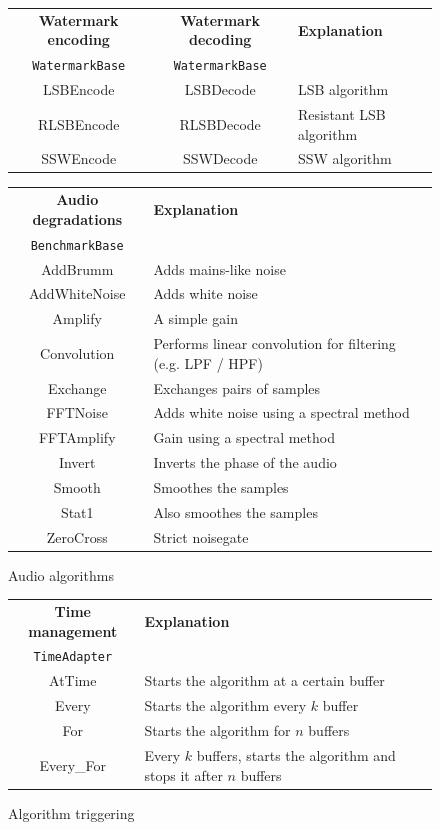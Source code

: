 \begin{figure}[h!]
\centering
\begin{tabular}{|c|c|l|}
\hline
\textbf{Watermark encoding} & \textbf{Watermark decoding} & \textbf{Explanation} \\
\texttt{WatermarkBase} & \texttt{WatermarkBase} & \\
\hline
LSBEncode & LSBDecode & \ac{LSB} algorithm \\
RLSBEncode & RLSBDecode & Resistant \ac{LSB} algorithm \\
SSWEncode & SSWDecode & \ac{SSW} algorithm \\
\hline
\end{tabular}

\vspace{1em}

\begin{tabular}{|c|l|}
\hline
\textbf{Audio degradations} & \textbf{Explanation} \\
\texttt{BenchmarkBase} & \\
\hline
AddBrumm & Adds mains-like noise \\
AddWhiteNoise & Adds white noise \\
Amplify & A simple gain \\
Convolution & Performs linear convolution for filtering (e.g. LPF / HPF)\cite{convolution}\\
Exchange & Exchanges pairs of samples \\
FFTNoise & Adds white noise using a spectral method \\
FFTAmplify & Gain using a spectral method \\
Invert & Inverts the phase of the audio \\
Smooth & Smoothes the samples \\ 
Stat1 & Also smoothes the samples \\
ZeroCross & Strict noisegate\\
\hline
\end{tabular} 
\caption{Audio algorithms}
\label{frameworkclass2}
\end{figure}

\begin{figure}[h!]
\centering
\begin{tabular}{|c|l|}
\hline
\textbf{Time management} & \textbf{Explanation} \\
\texttt{TimeAdapter} & \\
\hline
AtTime & Starts the algorithm at a certain buffer \\
Every & Starts the algorithm every $k$ buffer \\
For & Starts the algorithm for $n$ buffers \\
Every\_For & Every $k$ buffers, starts the algorithm and stops it after $n$ buffers\\
\hline
\end{tabular}
\caption{Algorithm triggering}
\label{frameworkclass3}
\end{figure}

